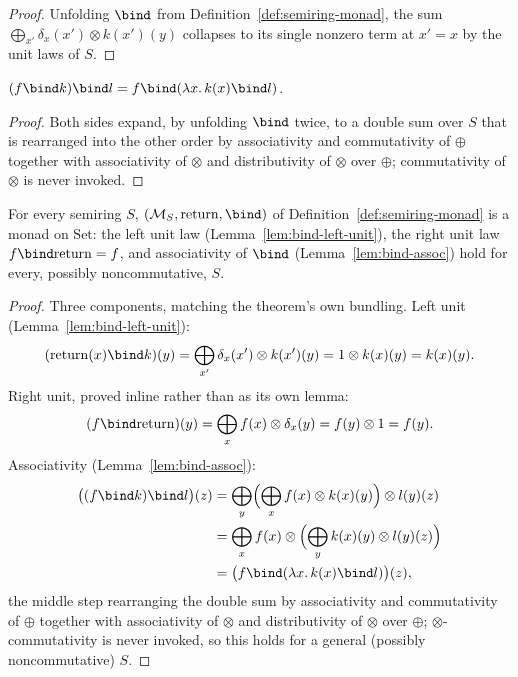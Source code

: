 \begin{proof}
\leanok
Unfolding $\bind$ from Definition~\ref{def:semiring-monad}, the sum
$\bigoplus_{x'}\delta_x(x')\otimes k(x')(y)$ collapses to its single
nonzero term at $x'=x$ by the unit laws of $S$.
\end{proof}

\begin{lemma}
\label{lem:bind-assoc}
\leanok
$(f \bind k) \bind l = f \bind (\lambda x.\, k(x) \bind l)$.
\end{lemma}

\begin{proof}
\leanok
Both sides expand, by unfolding $\bind$ twice, to a double sum over
$S$ that is rearranged into the other order by associativity and
commutativity of $\oplus$ together with associativity of $\otimes$
and distributivity of $\otimes$ over $\oplus$; commutativity of
$\otimes$ is never invoked.
\end{proof}

\begin{theorem}
\label{thm:semiring-monad-laws}
\leanok
For every semiring $S$, $(\MS{S}, \Ret, \bind)$ of
Definition~\ref{def:semiring-monad} is a monad on $\mathrm{Set}$: the
left unit law (Lemma~\ref{lem:bind-left-unit}), the right unit law
$f \bind \Ret = f$, and associativity of $\bind$
(Lemma~\ref{lem:bind-assoc}) hold for every, possibly noncommutative, $S$.
\end{theorem}

\begin{proof}
\leanok
Three components, matching the theorem's own bundling. Left unit
(Lemma~\ref{lem:bind-left-unit}):
\[
  (\Ret(x) \bind k)(y) = \bigoplus_{x'} \delta_x(x') \otimes k(x')(y)
    = 1 \otimes k(x)(y) = k(x)(y).
\]
Right unit, proved inline rather than as its own lemma:
\[
  (f \bind \Ret)(y) = \bigoplus_x f(x) \otimes \delta_x(y) = f(y) \otimes 1 = f(y).
\]
Associativity (Lemma~\ref{lem:bind-assoc}):
\begin{align*}
  \bigl((f\bind k)\bind l\bigr)(z)
    &= \bigoplus_y\Bigl(\bigoplus_x f(x)\otimes k(x)(y)\Bigr)\otimes l(y)(z) \\
    &= \bigoplus_x f(x) \otimes \Bigl(\bigoplus_y k(x)(y)\otimes l(y)(z)\Bigr) \\
    &= \bigl(f\bind(\lambda x.\, k(x) \bind l)\bigr)(z),
\end{align*}
the middle step rearranging the double sum by associativity and
commutativity of $\oplus$ together with associativity of $\otimes$ and
distributivity of $\otimes$ over $\oplus$; $\otimes$-commutativity is
never invoked, so this holds for a general (possibly noncommutative)
$S$.
\end{proof}


